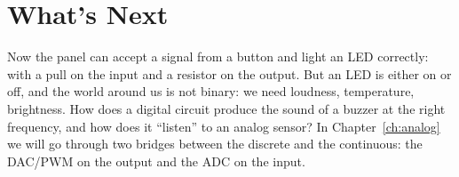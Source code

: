 \section{What's Next}

Now the panel can accept a signal from a button and light an LED correctly:
with a pull on the input and a resistor on the output. But an LED is either on or off,
and the world around us is not binary: we need loudness, temperature, brightness. How does a digital
circuit produce the sound of a buzzer at the right frequency, and how does it ``listen'' to an analog
sensor? In Chapter~\ref{ch:analog} we will go through two bridges between the discrete and the
continuous: the DAC/PWM on the output and the ADC on the input.
